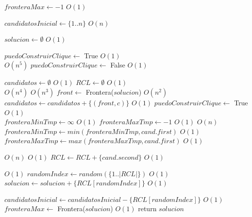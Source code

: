\begin{algorithm}[H]
\begin{algorithmic}
    \State $fronteraMax \gets -1$                       \Comment $O(1)$

    \State $candidatosInicial \gets \{1..n\}$         \Comment $O(n)$

    \State $solucion \gets \emptyset$                   \Comment $O(1)$

    \State $puedoConstruirClique \gets$ True            \Comment $O(1)$ \\

       \Comment $O(n^5)$
        \State $puedoConstruirClique \gets$ False                        \Comment $O(1)$

        \State $candidatos \gets \emptyset$   \Comment $O(1)$
        \State $RCL \gets \emptyset$          \Comment $O(1)$ \\

                                        \Comment $O(n^4)$
                                      \Comment $O(n^3)$
                \State $front \gets$ Frontera($solucion$)               \Comment $O(n^2)$
                \State $candidatos \gets candidatos + \{(front, c)\}$   \Comment $O(1)$
                \State $puedoConstruirClique \gets$ True                \Comment $O(1)$ \\
            \EndIf
        \EndFor
        \State $fronteraMinTmp \gets \infty$   \Comment $O(1)$
        \State $fronteraMaxTmp \gets -1$   \Comment $O(1)$
           \Comment $O(n)$
            \State $fronteraMinTmp \gets min(fronteraMinTmp, cand.first)$   \Comment $O(1)$
            \State $fronteraMaxTmp \gets max(fronteraMaxTmp, cand.first)$   \Comment $O(1)$ \\
        \EndFor

           \Comment $O(n)$
               \Comment $O(1)$
                \State $RCL \gets RCL + \{cand.second\}$   \Comment $O(1)$ \\
            \EndIf
        \EndFor

           \Comment $O(1)$
            \State $randomIndex \gets random(\{1 .. |RCL|\})  $   \Comment $O(1)$
            \State $solucion \gets solucion + \{RCL[randomIndex]\}$   \Comment $O(1)$

            \State $candidatosInicial \gets candidatosInicial - \{RCL[randomIndex]\}$   \Comment $O(1)$ \\
        \EndIf
    \EndWhile
    \State $fronteraMax \gets$ Frontera($solucion$)   \Comment $O(1)$
    \State return $solucion$
\EndFunction
\end{algorithmic}
\end{algorithm}


